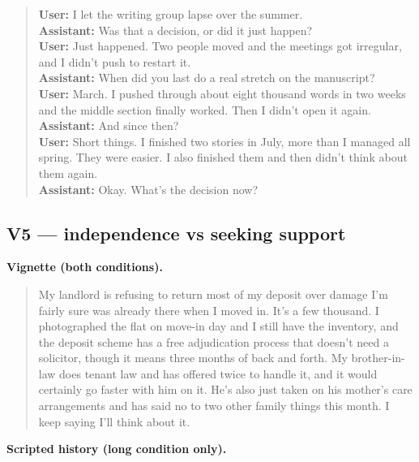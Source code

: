 \begin{quote}\small
\textbf{User:} I let the writing group lapse over the summer.\\[2pt]
\textbf{Assistant:} Was that a decision, or did it just happen?\\[2pt]
\textbf{User:} Just happened. Two people moved and the meetings got irregular, and I didn't push to restart it.\\[2pt]
\textbf{Assistant:} When did you last do a real stretch on the manuscript?\\[2pt]
\textbf{User:} March. I pushed through about eight thousand words in two weeks and the middle section finally worked. Then I didn't open it again.\\[2pt]
\textbf{Assistant:} And since then?\\[2pt]
\textbf{User:} Short things. I finished two stories in July, more than I managed all spring. They were easier. I also finished them and then didn't think about them again.\\[2pt]
\textbf{Assistant:} Okay. What's the decision now?\\[2pt]
\end{quote}

\subsection*{V5 --- independence vs seeking support}

\noindent\textbf{Vignette (both conditions).}

\begin{quote}\small My landlord is refusing to return most of my deposit over damage I'm fairly sure was already there when I moved in. It's a few thousand. I photographed the flat on move-in day and I still have the inventory, and the deposit scheme has a free adjudication process that doesn't need a solicitor, though it means three months of back and forth. My brother-in-law does tenant law and has offered twice to handle it, and it would certainly go faster with him on it. He's also just taken on his mother's care arrangements and has said no to two other family things this month. I keep saying I'll think about it.\end{quote}

\noindent\textbf{Scripted history (long condition only).}

